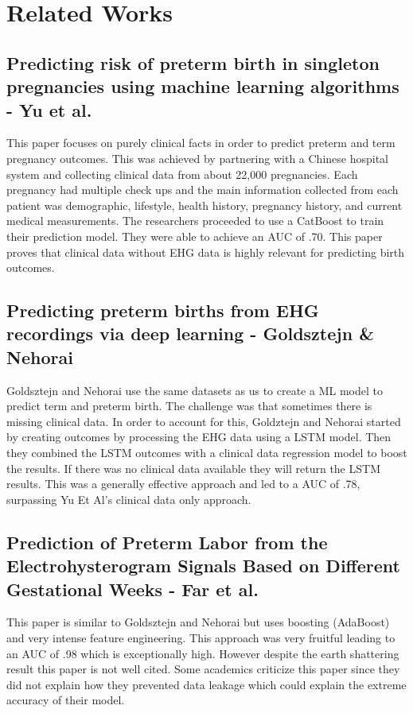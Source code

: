 \documentclass[conference]{IEEEtran}
\begin{document}
\section{Related Works}
\subsection{Predicting risk of preterm birth in singleton pregnancies using machine learning algorithms - Yu et al.}
This paper focuses on purely clinical facts in order to predict preterm and term pregnancy outcomes. This was achieved by partnering with a Chinese hospital system and collecting clinical data from about 22,000 pregnancies. Each pregnancy had multiple check ups and the main information collected from each patient was demographic, lifestyle, health history, pregnancy history, and current medical measurements. The researchers proceeded to use a CatBoost to train their prediction model. They were able to achieve an AUC of .70. This paper proves that clinical data without EHG data is highly relevant for predicting birth outcomes.

\subsection{Predicting preterm births from EHG recordings via deep learning - Goldsztejn \& Nehorai}
Goldsztejn and Nehorai use the same datasets as us to create a ML model to predict term and preterm birth. The challenge was that sometimes there is missing clinical data. In order to account for this, Goldztejn and Nehorai started by creating outcomes by processing the EHG data using a LSTM model. Then they combined the LSTM outcomes with a clinical data regression model to boost the results. If there was no clinical data available they will return the LSTM results. This was a generally effective approach and led to a AUC of .78, surpassing Yu Et Al’s clinical data only approach.

\subsection{Prediction of Preterm Labor from the Electrohysterogram Signals Based on Different Gestational Weeks - Far et al.}
This paper is similar to Goldsztejn and Nehorai but uses boosting (AdaBoost) and very intense feature engineering. This approach was very fruitful leading to an AUC of .98 which is exceptionally high. However despite the earth shattering result this paper is not well cited. Some academics criticize this paper since they did not explain how they prevented data leakage which could explain the extreme accuracy of their model.
\end{document}
